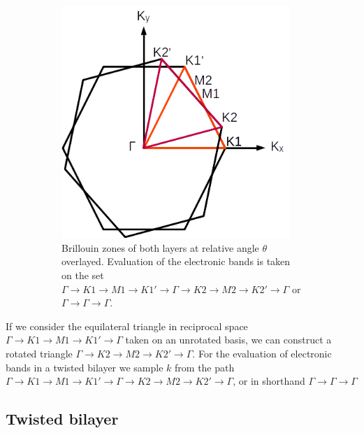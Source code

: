 \documentclass[12pt]{report} %
\begin{document}
\begin{figure}[t]
\begin{subfigure}[t]{0.475\textwidth}
    \includegraphics[width=0.95\textwidth]{heterostructure_BZ_path.png}
    \caption{
      Brillouin zones of both layers at relative angle $\theta$ overlayed. Evaluation of the electronic bands is taken on the set $\Gamma \rightarrow K1 \rightarrow M1 \rightarrow K1' \rightarrow \Gamma \rightarrow K2 \rightarrow M2 \rightarrow K2' \rightarrow \Gamma$ or $\Gamma \rightarrow \Gamma \rightarrow \Gamma$.
    }
    \label{heterostructure_BZ_path}
  \end{subfigure}
  \caption{
  }
\end{figure}

  If we consider the equilateral triangle in reciprocal space $\Gamma \rightarrow K1 \rightarrow M1 \rightarrow K1' \rightarrow \Gamma$ taken on an unrotated basis, we can construct a rotated triangle $\Gamma \rightarrow K2 \rightarrow M2 \rightarrow K2' \rightarrow \Gamma$. For the evaluation of electronic bands in a twisted bilayer we sample $k$ from the path $\Gamma \rightarrow K1 \rightarrow M1 \rightarrow K1' \rightarrow \Gamma \rightarrow K2 \rightarrow M2 \rightarrow K2' \rightarrow \Gamma$, or in shorthand $\Gamma \rightarrow \Gamma \rightarrow \Gamma$

\subsection*{Twisted bilayer}
\end{document}

